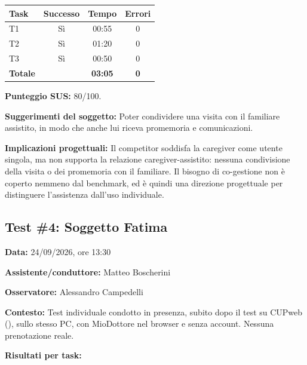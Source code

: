 \begin{center}
\begin{minipage}{\linewidth}
\centering
{}\label{tab:a-10}
\noindent\begin{tabular}{lccc}
\toprule
\textbf{Task} & \textbf{Successo} & \textbf{Tempo} & \textbf{Errori} \\
\midrule
T1 & Sì & 00:55 & 0 \\
T2 & Sì & 01:20 & 0 \\
T3 & Sì & 00:50 & 0 \\
\midrule
\textbf{Totale} & & \textbf{03:05} & \textbf{0} \\
\bottomrule
\end{tabular}
\end{minipage}
\end{center}

\textbf{Punteggio SUS:} 80/100.

\textbf{Suggerimenti del soggetto:} Poter condividere una visita con
il familiare assistito, in modo che anche lui riceva promemoria e
comunicazioni.

\textbf{Implicazioni progettuali:} Il competitor soddisfa la
caregiver come utente singola, ma non supporta la relazione
caregiver-assistito: nessuna condivisione della visita o dei
promemoria con il familiare. Il bisogno di co-gestione non è coperto nemmeno dal benchmark, ed è quindi
una direzione progettuale per distinguere l'assistenza dall'uso individuale.

\subsection{Test \#4: Soggetto Fatima}

\textbf{Data:} 24/09/2026, ore 13:30

\textbf{Assistente/conduttore:} Matteo Boscherini

\textbf{Osservatore:} Alessandro Campedelli

\textbf{Contesto:} Test individuale condotto in presenza, subito dopo
il test su CUPweb (), sullo stesso PC,
con MioDottore nel browser e senza account. Nessuna
prenotazione reale.

\textbf{Risultati per task:}

